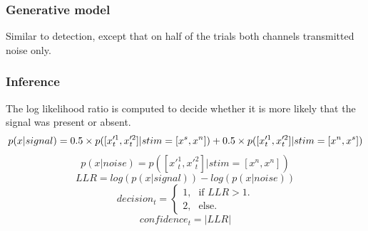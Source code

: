 \documentclass[12pt,twoside]{reedthesis}
\begin{document}
\hypertarget{generative-model-1}{%
\subsubsection*{Generative model}\label{generative-model-1}}

Similar to detection, except that on half of the trials both channels transmitted noise only.

\hypertarget{inference-1}{%
\subsubsection*{Inference}\label{inference-1}}

The log likelihood ratio is computed to decide whether it is more likely that the signal was present or absent.
\begin{equation}
p(x|signal)= 0.5 \times p([x'^1_t,x'^2_t]|stim=[x^s,x^n])  \\ 
+ 0.5 \times p([x'^1_t,x'^2_t]|stim=[x^n,x^s])
\end{equation}
\begin{equation}
p(x|noise)= p([x'^1_t,x'^2_t]|stim=[x^n,x^n])
\end{equation}
\begin{equation}
LLR=log(p(x|signal)) - log(p(x|noise))
\end{equation}
\begin{equation}
  decision_t=\begin{cases}
    \text{1}, & \text{if } LLR>1.\\
   \text{2}, & \text{else}.
    
  \end{cases}
\end{equation}
\begin{equation}
confidence_t = |LLR|
\end{equation}
\end{document}
